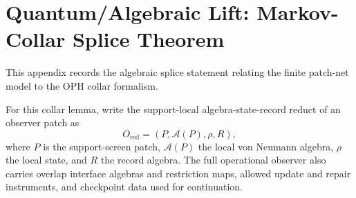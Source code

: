 \documentclass[11pt]{article}
\theoremstyle{remark}
\theoremstyle{plain}
\begin{document}
\appendix
\section{Quantum/Algebraic Lift: Markov-Collar Splice Theorem}\label{app:splice}

This appendix records the algebraic splice statement relating the finite patch-net model to
the OPH collar formalism.

For this collar lemma, write the support-local algebra-state-record reduct of an observer patch as
\[
O_{\mathrm{red}}=(P,\mathcal{A}(P),\rho,R),
\]
where $P$ is the support-screen patch, $\mathcal{A}(P)$ the local von Neumann algebra, $\rho$ the
local state, and $R$ the record algebra. The full operational observer also carries overlap
interface algebras and restriction maps, allowed update and repair instruments, and checkpoint data
used for continuation.
\end{document}
